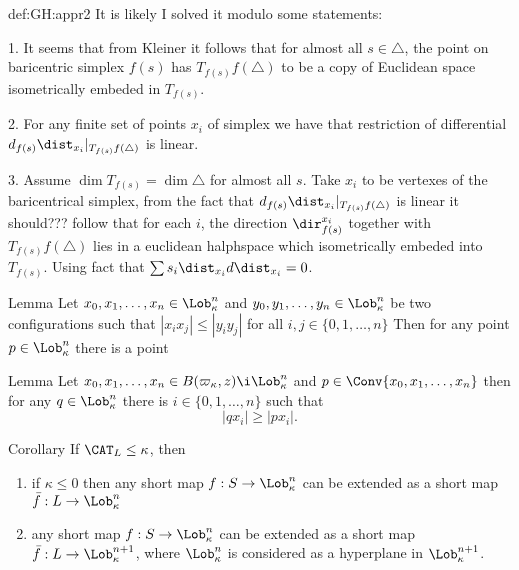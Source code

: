 {\begin{subthm}{def:GH:appr2}
It is likely I solved it modulo some statements:

1. It seems that from Kleiner it follows that for almost all $s\in\triangle$, the point on baricentric simplex $f(s)$ has
$T_{f(s)}f(\triangle)$ to be a copy of Euclidean space isometrically embeded in $T_{f(s)}$. 

2. For any finite set of points $x_i$ of simplex we have that restriction of differential $d_{f(s)}\dist_{x_i}|_{T_{f(s)}f(\triangle)}$ is linear.

3. Assume $\dim T_{f(s)}=\dim\triangle$ for almost all $s$. Take $x_i$ to be vertexes of the baricentrical simplex, from the fact that $d_{f(s)}\dist_{x_i}|_{T_{f(s)}f(\triangle)}$ is linear it should??? follow that for each $i$, the direction $\dir_{f(s)}^{x_i}$ together with $T_{f(s)}f(\triangle)$ lies in a euclidean halphspace which isometrically embeded into $T_{f(s)}$. Using fact that $\sum s_i\dist_{x_i}d\dist_{x_i}=0$.

\begin{thm}{Lemma}
Let $x_0,x_1,\dots,x_n\in \Lob_\kappa^n$ and $y_0,y_1,\dots,y_n\in \Lob_\kappa^n$ be two configurations such that $|x_ix_j|\le|y_iy_j|$ for all $i,j\in \{0,1,\dots,n\}$
Then for any point $p\in \Lob_\kappa^n$ there is a point 
\end{thm}

\begin{thm}{Lemma}
Let $x_0,x_1,\dots,x_n\in B(\varpi_\kappa,z)\i\Lob_\kappa^n$ and $p\in \Conv\{x_0,x_1,\dots,x_n\}$ then for any $q\in \Lob_\kappa^n$ there is $i\in\{0,1,\dots,n\}$ such that
$$|qx_i|\ge |px_i|.$$
\end{thm}















\begin{thm}{Corollary}
If $\CAT_L\le \kappa$, then
\begin{enumerate}
\item if $\kappa\le 0$ then any short map $f:S\to\Lob_\kappa^n$ 
can be extended as a short map $\bar f:L\to\Lob_\kappa^{n}$
\item any short map $f:S\to\Lob_\kappa^n$ 
can be extended as a short map $\bar f:L\to\Lob_\kappa^{n+1}$, where $\Lob_\kappa^n$ is considered as a hyperplane in $\Lob_\kappa^{n+1}$.
\end{enumerate}
\end{thm}


\end{subthm}}
